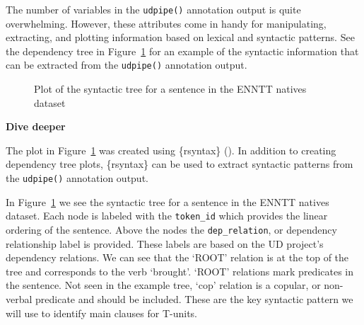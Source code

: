 \documentclass[
  letterpaper,
  krantz1]{latex/krantz-mod}
\theoremstyle{definition}
\theoremstyle{definition}
\theoremstyle{remark}
\begin{document}
The number of variables in the \texttt{udpipe()} annotation output is
quite overwhelming. However, these attributes come in handy for
manipulating, extracting, and plotting information based on lexical and
syntactic patterns. See the dependency tree in
Figure~\ref{fig-transform-generation-udpipe-english-plot-tree} for an
example of the syntactic information that can be extracted from the
\texttt{udpipe()} annotation output.

\begin{figure}[!htb]


\caption{\label{fig-transform-generation-udpipe-english-plot-tree}Plot
of the syntactic tree for a sentence in the ENNTT natives dataset}

\end{figure}%

\begin{tcolorbox}[enhanced jigsaw, toprule=.15mm, breakable, colback=white, arc=.35mm, left=2mm, colframe=quarto-callout-color-frame, opacityback=0, bottomrule=.15mm, rightrule=.15mm, leftrule=.75mm]

\textbf{ Dive deeper}

The plot in
Figure~\ref{fig-transform-generation-udpipe-english-plot-tree} was
created using \{rsyntax\} (). In addition to creating dependency tree plots,
\{rsyntax\} can be used to extract syntactic patterns from the
\texttt{udpipe()} annotation output.

\end{tcolorbox}

In Figure~\ref{fig-transform-generation-udpipe-english-plot-tree} we see
the syntactic tree for a sentence in the ENNTT natives dataset. Each
node is labeled with the \texttt{token\_id} which provides the linear
ordering of the sentence. Above the nodes the \texttt{dep\_relation}, or
dependency relationship label is provided. These labels are based on the
UD project's dependency relations. We can see that the `ROOT' relation
is at the top of the tree and corresponds to the verb `brought'. `ROOT'
relations mark predicates in the sentence. Not seen in the example tree,
`cop' relation is a copular, or non-verbal predicate and should be
included. These are the key syntactic pattern we will use to identify
main clauses for T-units.
\end{document}
